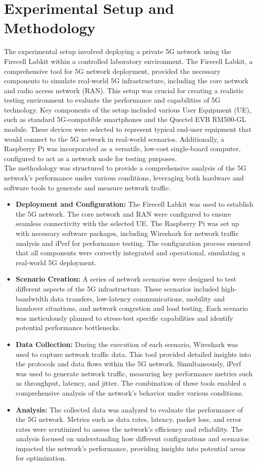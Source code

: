 \documentclass{report}
\begin{document}
\chapter{Experimental Setup and Methodology}
The experimental setup involved deploying a private 5G network using the Firecell Labkit within a controlled laboratory environment. The Firecell Labkit, a comprehensive tool for 5G network deployment, provided the necessary components to simulate real-world 5G infrastructure, including the core network and radio access network (RAN). This setup was crucial for creating a realistic testing environment to evaluate the performance and capabilities of 5G technology.
Key components of the setup included various User Equipment (UE), such as standard 5G-compatible smartphones and the Quectel EVB RM500-GL module. These devices were selected to represent typical end-user equipment that would connect to the 5G network in real-world scenarios. Additionally, a Raspberry Pi was incorporated as a versatile, low-cost single-board computer, configured to act as a network node for testing purposes.\\
The methodology was structured to provide a comprehensive analysis of the 5G network's performance under various conditions, leveraging both hardware and software tools to generate and measure network traffic.
\begin{itemize}
\item \textbf{Deployment and Configuration:} The Firecell Labkit was used to establish the 5G network. The core network and RAN were configured to ensure seamless connectivity with the selected UE. The Raspberry Pi was set up with necessary software packages, including Wireshark for network traffic analysis and iPerf for performance testing. The configuration process ensured that all components were correctly integrated and operational, simulating a real-world 5G deployment.
\item \textbf{Scenario Creation:} A series of network scenarios were designed to test different aspects of the 5G infrastructure. These scenarios included high-bandwidth data transfers, low-latency communications, mobility and handover situations, and network congestion and load testing. Each scenario was meticulously planned to stress-test specific capabilities and identify potential performance bottlenecks.
\item \textbf{Data Collection:} During the execution of each scenario, Wireshark was used to capture network traffic data. This tool provided detailed insights into the protocols and data flows within the 5G network. Simultaneously, iPerf was used to generate network traffic, measuring key performance metrics such as throughput, latency, and jitter. The combination of these tools enabled a comprehensive analysis of the network's behavior under various conditions.
\item \textbf{Analysis:} The collected data was analyzed to evaluate the performance of the 5G network. Metrics such as data rates, latency, packet loss, and error rates were scrutinized to assess the network's efficiency and reliability. The analysis focused on understanding how different configurations and scenarios impacted the network's performance, providing insights into potential areas for optimization.
\end{itemize}
\end{document}
